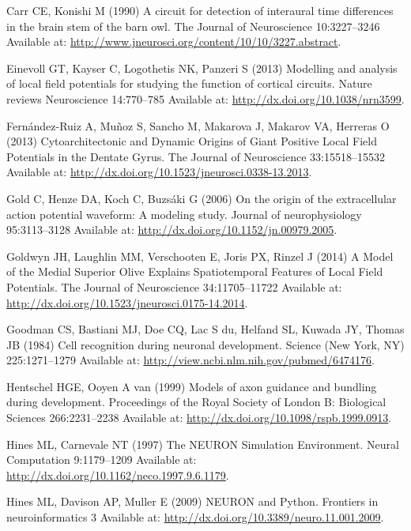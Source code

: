 \documentclass[]{article}
\begin{document}
Carr CE, Konishi M (1990) A circuit for detection of interaural time
differences in the brain stem of the barn owl. The Journal of
Neuroscience 10:3227--3246 Available at:
\url{http://www.jneurosci.org/content/10/10/3227.abstract}.

Einevoll GT, Kayser C, Logothetis NK, Panzeri S (2013) Modelling and
analysis of local field potentials for studying the function of cortical
circuits. Nature reviews Neuroscience 14:770--785 Available at:
\url{http://dx.doi.org/10.1038/nrn3599}.

Fernández-Ruiz A, Muñoz S, Sancho M, Makarova J, Makarov VA, Herreras O
(2013) Cytoarchitectonic and Dynamic Origins of Giant Positive Local
Field Potentials in the Dentate Gyrus. The Journal of Neuroscience
33:15518--15532 Available at:
\url{http://dx.doi.org/10.1523/jneurosci.0338-13.2013}.

Gold C, Henze DA, Koch C, Buzsáki G (2006) On the origin of the
extracellular action potential waveform: A modeling study. Journal of
neurophysiology 95:3113--3128 Available at:
\url{http://dx.doi.org/10.1152/jn.00979.2005}.

Goldwyn JH, Laughlin MM, Verschooten E, Joris PX, Rinzel J (2014) A
Model of the Medial Superior Olive Explains Spatiotemporal Features of
Local Field Potentials. The Journal of Neuroscience 34:11705--11722
Available at: \url{http://dx.doi.org/10.1523/jneurosci.0175-14.2014}.

Goodman CS, Bastiani MJ, Doe CQ, Lac S du, Helfand SL, Kuwada JY, Thomas
JB (1984) Cell recognition during neuronal development. Science (New
York, NY) 225:1271--1279 Available at:
\url{http://view.ncbi.nlm.nih.gov/pubmed/6474176}.

Hentschel HGE, Ooyen A van (1999) Models of axon guidance and bundling
during development. Proceedings of the Royal Society of London B:
Biological Sciences 266:2231--2238 Available at:
\url{http://dx.doi.org/10.1098/rspb.1999.0913}.

Hines ML, Carnevale NT (1997) The NEURON Simulation Environment. Neural
Computation 9:1179--1209 Available at:
\url{http://dx.doi.org/10.1162/neco.1997.9.6.1179}.

Hines ML, Davison AP, Muller E (2009) NEURON and Python. Frontiers in
neuroinformatics 3 Available at:
\url{http://dx.doi.org/10.3389/neuro.11.001.2009}.
\end{document}
